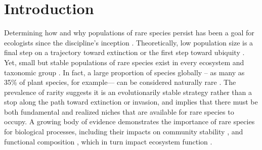 \documentclass[12pt, letterpaper]{article}
\begin{document}
\section{Introduction}
Determining how and why populations of rare species persist has been a goal for ecologists since the discipline's inception \cite{Levins1971RegionalSpecies, Drury1974RareSpecies}. Theoretically, low population size is a final step on a trajectory toward extinction \cite{Stanley1979Macroevolution:Process, Rosenzweig1997TheRarity} or the first step toward ubiquity \cite{Spear2021}.  Yet, small but stable populations of rare species exist in every ecosystem and taxonomic group \cite{Magurran2011CommonnessRarity}. In fact, a large proportion of species globally – as many as 35\% of plant species, for example— can be considered naturally rare \cite{Enquist2019ThePlants}. The prevalence of rarity suggests it is an evolutionarily stable strategy rather than a stop along the path toward extinction or invasion, and implies that there must be both fundamental and realized niches that are available for rare species to occupy. A growing body of evidence demonstrates the importance of rare species for biological processes, including their impacts on community stability \cite{Arnoldi2019ThePatterns, Saterberg2019ADynamics}, and functional composition \cite{Leitao2016RareAssemblages, Burner2022FunctionalSpecies}, which in turn impact ecosystem function \cite{Lyons2005RareFunctioning}. 
\end{document}
